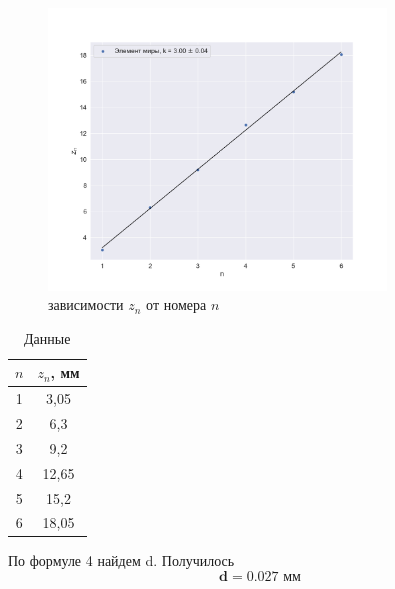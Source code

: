 \documentclass[a4paper, 12pt]{article}
\begin{document}
\begin{figure}[H]
	\centering
	\includegraphics[width=0.8\textwidth]{plot2.png}
	\caption{зависимости $z_n$ от номера $n$}
	\label{fig:plo2}
\end{figure}

\begin{table}[H]
	\centering
	\begin{tabular}{|c|c|}
	\hline
	\textbf{$n$} & \textbf{$z_n$, мм} \\ \hline
	1              & 3,05           \\ \hline
	2              & 6,3            \\ \hline
	3              & 9,2            \\ \hline
	4              & 12,65          \\ \hline
	5              & 15,2           \\ \hline
	6              & 18,05          \\ \hline
	\end{tabular}
	\caption{Данные}
	\label{tab:datamir}
	\end{table}

По формуле 4 найдем d. Получилось
\begin{equation}
	\mathbf{d = 0.027 \text{ мм}}
\end{equation}
\end{document}
